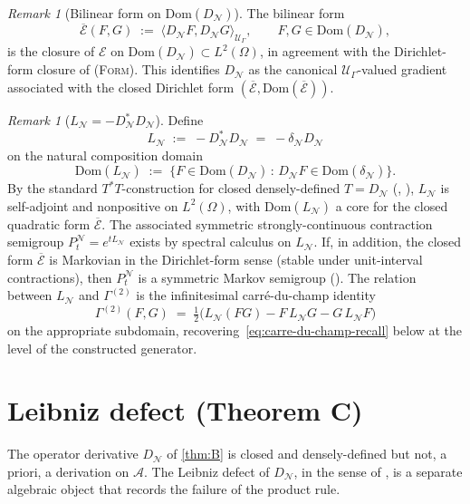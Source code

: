 \documentclass[11pt,reqno]{amsart}
\theoremstyle{plain}
\theoremstyle{definition}
\theoremstyle{remark}
\newtheorem{remark}[theorem]{Remark}
\newcommand{\Dom}{\mathrm{Dom}}
\newcommand{\cA}{\mathcal A}
\newcommand{\cE}{\mathcal E}
\newcommand{\cN}{\mathcal N}
\newcommand{\cU}{\mathcal U}
\newcommand{\dN}{D_{\cN}}
\newcommand{\divN}{\delta_{\cN}}
\begin{document}
\begin{remark}[Bilinear form on $\Dom(\dN)$]\label{rem:closed-form}
The bilinear form
\[
  \overline{\cE}(F,G)\;:=\;\langle\dN F,\dN G\rangle_{\cU_{\Gamma}},
  \qquad F,G\in\Dom(\dN),
\]
is the closure of $\cE$ on $\Dom(\dN)\subset L^{2}(\Omega)$,
in agreement with the Dirichlet-form closure of \textsc{(Form)}.
This identifies $\dN$ as the canonical $\cU_{\Gamma}$-valued
gradient associated with the closed Dirichlet form
$(\overline{\cE},\Dom(\overline{\cE}))$.
\end{remark}

\begin{remark}[$L_{\cN}=-\dN^{*}\dN$]\label{rem:generator}
Define
\[
  L_{\cN}\;:=\;-\dN^{*}\dN\;=\;-\divN\dN
\]
on the natural composition domain
\[
  \Dom(L_{\cN})
  \;:=\;\bigl\{F\in\Dom(\dN)\,:\,\dN F\in\Dom(\divN)\bigr\}.
\]
By the standard $T^{*}T$-construction for closed densely-defined
$T=\dN$ (\cite[Thm.~13.13]{Rudin-FA}, \cite[Ch.~5]{Schmuedgen}),
$L_{\cN}$ is self-adjoint and nonpositive on $L^{2}(\Omega)$,
with $\Dom(L_{\cN})$ a core for the closed quadratic form
$\overline{\cE}$. The associated symmetric strongly-continuous
contraction semigroup $P_{t}^{\cN}=e^{tL_{\cN}}$ exists by
spectral calculus on $L_{\cN}$. If, in addition, the closed
form $\overline{\cE}$ is Markovian in the Dirichlet-form sense
(stable under unit-interval contractions), then $P_{t}^{\cN}$
is a symmetric Markov semigroup
(\cite[Ch.~1]{FukushimaOshimaTakeda}). The relation between
$L_{\cN}$ and $\Gamma^{(2)}$ is the infinitesimal
carr\'e-du-champ identity
\[
  \Gamma^{(2)}(F,G)\;=\;\tfrac{1}{2}\bigl(L_{\cN}(FG)-F\,L_{\cN}G-G\,L_{\cN}F\bigr)
\]
on the appropriate subdomain, recovering~\eqref{eq:carre-du-champ-recall}
below at the level of the constructed generator.
\end{remark}

\section{Leibniz defect (Theorem C)}\label{sec:leibnizC}

The operator derivative $\dN$ of \cref{thm:B} is closed and
densely-defined but not, a priori, a derivation on $\cA$. The
Leibniz defect of $\dN$, in the sense of
\cite[Def.~5.4]{PrimitiveDivergence}, is a separate algebraic
object that records the failure of the product rule.
\end{document}
